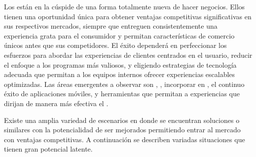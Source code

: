 		Los \online \retailers están en la cúspide de una forma totalmente nueva de hacer negocios. Ellos tienen una oportunidad única para obtener ventajas competitivas significativas en sus respectivos mercados, siempre que entreguen consistentemente una experiencia grata para el consumidor y permitan características de comercio \multichannel únicos antes que sus competidores. El éxito dependerá en perfeccionar los esfuerzos para abordar las experiencias de clientes centrados en el usuario, reducir el enfoque a los programas más valiosos, y eligiendo estrategias de tecnología adecuada que permitan a los equipos internos ofrecer experiencias escalables optimizadas. Las áreas emergentes a observar son \realTimeINT, \retail \analytics, incorporar \socialnetwork en \ecommerceCOM, el continuo éxito de aplicaciones móviles, y herramientas que permitan a \retailers \scale experiencias que dirijan de manera más efectiva el \merchandising.


		Existe una amplia variedad de escenarios en donde se encuentran soluciones \ecommerceCOM o similares con la potencialidad de ser mejorados permitiendo entrar al mercado con ventajas competitivas. A continuación se describen variadas situaciones que tienen gran potencial latente.

